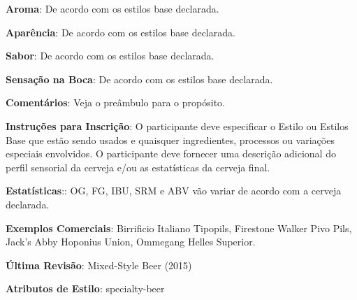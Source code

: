 \textbf{Aroma}: De acordo com os estilos base declarada.

\textbf{Aparência}: De acordo com os estilos base declarada.

\textbf{Sabor}: De acordo com os estilos base declarada.

\textbf{Sensação na Boca}: De acordo com os estilos base declarada.

\textbf{Comentários}: Veja o preâmbulo para o propósito.

\textbf{Instruções para Inscrição}: O participante deve especificar o Estilo ou Estilos Base que estão sendo usados e quaisquer ingredientes, processos ou variações especiais envolvidos. O participante deve fornecer uma descrição adicional do perfil sensorial da cerveja e/ou as estatísticas da cerveja final.

\textbf{Estatísticas}:: OG, FG, IBU, SRM e ABV vão variar de acordo com a cerveja declarada.

\textbf{Exemplos Comerciais}: Birrificio Italiano Tipopils, Firestone Walker Pivo Pils, Jack’s Abby Hoponius Union, Ommegang Helles Superior.

\textbf{Última Revisão}: Mixed-Style Beer (2015)

\textbf{Atributos de Estilo}: specialty-beer
